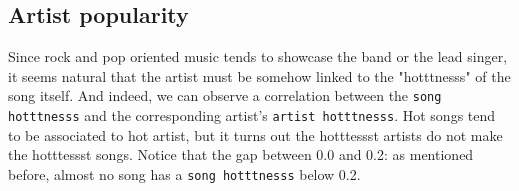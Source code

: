 \documentclass[11pt]{article}
\renewcommand\_{\textunderscore\allowbreak}
\begin{document}




\subsection{Artist popularity}
Since rock and pop oriented music tends to showcase the band or the lead singer, it seems natural that the artist must be somehow linked to the "hotttnesss" of the song itself.
And indeed, we can observe a correlation between the \texttt{song hotttnesss} and the corresponding artist's \texttt{artist hotttnesss}.
Hot songs tend to be associated to hot artist, but it turns out the hotttessst artists do not make the hotttessst songs.
Notice that the gap between 0.0 and 0.2: as mentioned before, almost no song has a \texttt{song hotttnesss} below 0.2.
\end{document}
